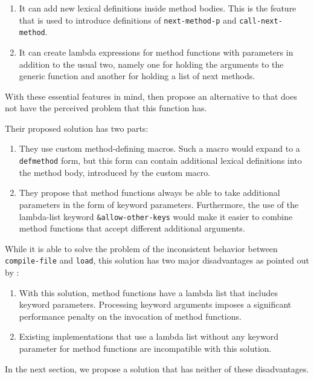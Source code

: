 \begin{enumerate}
\item It can add new lexical definitions inside method bodies.  This
  is the feature that is used to introduce definitions of
  \texttt{next-method-p} and \texttt{call-next-method}.
\item It can create lambda expressions for method functions with
  parameters in addition to the usual two, namely one for holding the
  arguments to the generic function and another for holding a list of
  next methods.
\end{enumerate}

With these essential features in mind, \cnh{} then propose an
alternative to \mml{} that does not have the perceived problem that
this function has.

Their proposed solution has two parts:

\begin{enumerate}
\item They use custom method-defining macros.  Such a macro would
  expand to a \texttt{defmethod} form, but this form can contain
  additional lexical definitions into the method body, introduced by
  the custom macro.
\item They propose that method functions always be able to take
  additional parameters in the form of \commonlisp{} keyword
  parameters.  Furthermore, the use of the lambda-list keyword
  \texttt{\&allow-other-keys} would make it easier to combine method
  functions that accept different additional arguments.
\end{enumerate}

While it is able to solve the problem of the inconsistent behavior
between \texttt{compile-file} and \texttt{load}, this solution has two
major disadvantages as pointed out by \cnh{}:

\begin{enumerate}
\item With this solution, method functions have a lambda list that
  includes keyword parameters.  Processing keyword arguments imposes a
  significant performance penalty on the invocation of method
  functions.
\item Existing \clos{} implementations that use a lambda list without
  any keyword parameter for method functions are incompatible with
  this solution.
\end{enumerate}

In the next section, we propose a solution that has neither of these
disadvantages.

